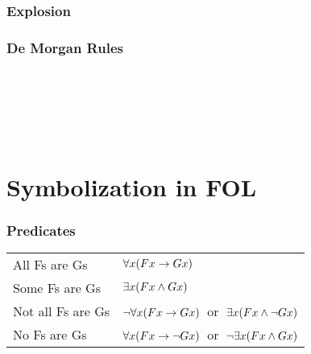 \begin{multicols}{2}
\subsubsection*{Explosion}
	\begin{fitchproof}
	 
	\end{fitchproof}


%
%

\subsubsection*{De Morgan Rules}
\begin{fitchproof}

\\	

\\	

\\	
\end{fitchproof}
\end{multicols}

\newpage




\vspace*{2cm}
\section{Symbolization in FOL}
\subsubsection*{Predicates}
\begin{center}
	\begin{tabular*}{\textwidth}{ll}\label{SymbolizingPredicates}
		All Fs are Gs & $\forall x(Fx \rightarrow Gx)$\\
		Some Fs are Gs & $\exists x(Fx \mathbin{\wedge} Gx)$\\
		Not all Fs are Gs & $\neg\forall x(Fx \rightarrow Gx)$\ or\ $\exists x(Fx \mathbin{\wedge} \neg Gx)$\\
		No Fs are Gs & $\forall x(Fx \rightarrow\neg Gx)$\ or\ $\neg\exists x(Fx \mathbin{\wedge} Gx)$\\
	\end{tabular*}
\end{center}

